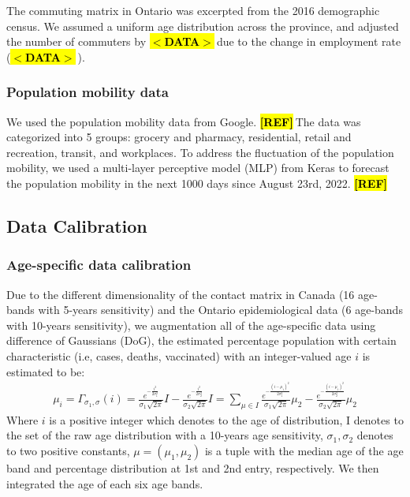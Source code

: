 \documentclass[12pt]{article}
\newcommand{\vect}[1]{\left( #1 \right)}
\newcommand{\pendingref}{\textbf{\hl{[REF]}}$ \ $}
\newcommand{\unknownref}{\textcolor{ReD}{\textbf{\hl{[REF]}}}$ \ $}
\newcommand{\pendingdata}{\textbf{\hl{$<$DATA$>$}}$ \ $}
\begin{document}
The commuting matrix in Ontario was excerpted from the 2016 demographic census. We assumed a uniform age distribution across the province, and adjusted the number of commuters by \pendingdata due to the change in employment rate (\pendingdata). 

\subsubsection{Population mobility data}

We used the population mobility data from Google. \unknownref The data was categorized into 5 groups: grocery and pharmacy, residential, retail and recreation, transit, and workplaces. To address the fluctuation of the population mobility, we used a multi-layer perceptive model (MLP) from Keras to forecast the population mobility in the next 1000 days since August 23rd, 2022. \cite{ref6} \pendingref 


\subsection{Data Calibration}

\subsubsection{Age-specific data calibration}

Due to the different dimensionality of the contact matrix in Canada (16 age-bands with 5-years sensitivity) and the Ontario epidemiological data (6 age-bands with 10-years sensitivity), we augmentation all of the age-specific data using difference of Gaussians (DoG), the estimated percentage population with certain characteristic (i.e, cases, deaths, vaccinated) with an integer-valued age $i$ is estimated to be:
\begin{gather}
    \mu_{i} = \Gamma_{\sigma_1, \sigma} (i) = \frac{e^{-\frac{i^2}{2 \sigma_1^2}}}{\sigma_1 \sqrt{2\pi}} I - \frac{e^{-\frac{i^2}{2 \sigma_2^2}}}{\sigma_2 \sqrt{2\pi}} I = \sum_{\mu \in I} \frac{e^{-\frac{(i - \mu_1)^2}{2 \sigma_1^2}}}{\sigma_1 \sqrt{2\pi}} \mu_2 - \frac{e^{-\frac{(i - \mu_1)^2}{2 \sigma_2^2}}}{\sigma_2 \sqrt{2\pi}} \mu_2
\end{gather}
Where $i$ is a positive integer which denotes to the age of distribution, I denotes to the set of the raw age distribution with a 10-years age sensitivity, $\sigma_1, \sigma_2$ denotes to two positive constants, $\mu = \vect   {\mu_1, \mu_2}$ is a tuple with the median age of the age band and percentage distribution at 1st and 2nd entry, respectively. We then integrated the age of each six age bands. 
\end{document}
